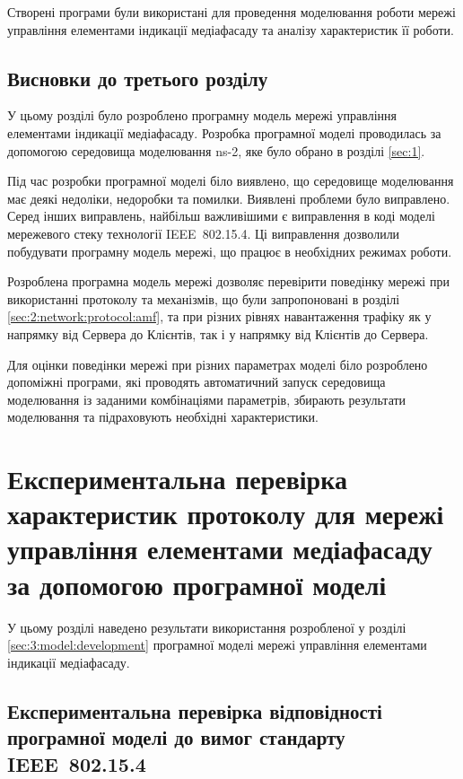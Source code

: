 \documentclass[a4paper,ukrainian,utf8,nocolumnsxix,nocolumnxxxii,nocolumnxxxi,floatsection,equationsection]{eskdtext}
\newcommand{\iee}[0]{IEEE~802.15.4\xspace}
\begin{document}
Створені програми були використані для проведення моделювання роботи мережі управління елементами індикації медіафасаду та аналізу характеристик її роботи. 

\subsection{Висновки до третього розділу}

У цьому розділі було розроблено програмну модель мережі управління елементами індикації медіафасаду. Розробка програмної моделі проводилась за допомогою середовища моделювання ns-2, яке було обрано в розділі \ref{sec:1}.

Під час розробки програмної моделі біло виявлено, що середовище моделювання має деякі недоліки, недоробки та помилки. Виявлені проблеми було виправлено. Серед інших виправлень, найбільш важливішими є виправлення в коді моделі мережевого стеку технології \iee. Ці виправлення дозволили побудувати програмну модель мережі, що працює в необхідних режимах роботи. 

Розроблена програмна модель мережі дозволяє перевірити поведінку мережі при використанні протоколу та механізмів, що були запропоновані в розділі \ref{sec:2:network:protocol:amf}, та при різних рівнях навантаження трафіку як у напрямку від Сервера до Клієнтів, так і у напрямку від Клієнтів до Сервера.

Для оцінки поведінки мережі при різних параметрах моделі біло розроблено допоміжні програми, які проводять автоматичний запуск середовища моделювання із заданими комбінаціями параметрів, збирають результати моделювання та підраховують необхідні характеристики.

\section{Експериментальна перевірка характеристик протоколу для мережі управління елементами медіафасаду за допомогою програмної моделі}
\label{sec:4:modelling}

У цьому розділі наведено результати використання розробленої у розділі \ref{sec:3:model:development} програмної моделі мережі управління елементами індикації медіафасаду.

\subsection{Експериментальна перевірка відповідності програмної моделі до вимог стандарту \iee}
\label{sub:simulation_speed_test}
\end{document}
